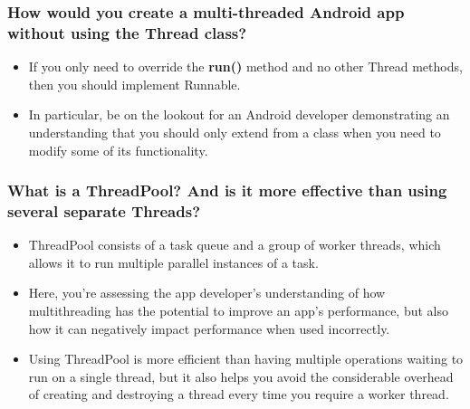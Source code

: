 \documentclass[9pt, b5paper]{article}
\begin{document}
\subsubsection{How would you create a multi-threaded Android app without using the Thread class?}
\label{sec-1-2-15}
\begin{itemize}
\item If you only need to override the \textbf{run()} method and no other Thread methods, then you should implement Runnable.
\item In particular, be on the lookout for an Android developer demonstrating an understanding that you should only extend from a class when you need to modify some of its functionality.
\end{itemize}
\subsubsection{What is a ThreadPool? And is it more effective than using several separate Threads?}
\label{sec-1-2-16}
\begin{itemize}
\item ThreadPool consists of a task queue and a group of worker threads, which allows it to run multiple parallel instances of a task.
\item Here, you're assessing the app developer's understanding of how multithreading has the potential to improve an app's performance, but also how it can negatively impact performance when used incorrectly.
\item Using ThreadPool is more efficient than having multiple operations waiting to run on a single thread, but it also helps you avoid the considerable overhead of creating and destroying a thread every time you require a worker thread.
\end{itemize}
\end{document}
